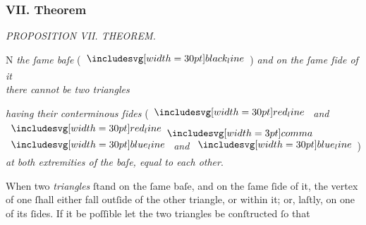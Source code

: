 \documentclass[11pt,preview]{standalone}
\begin{document}
\subsubsection{VII. Theorem}

\begin{minipage}[t]{0.55\textwidth}
    \begin{center}
        \textit{PROPOSITION VII. THEOREM.}\label{book1pr7} \\
    \end{center}

    \hfill

    \begin{center}
        \raggedright \lettrine[lines=3, loversize=1, nindent=0pt]{}{}N \textit{the ſame baſe} (\hspace{-1ex}$\blackline$\hspace{-1ex}) \textit{and on the ſame ſide of it\\ there cannot be two triangles}
    \end{center}
    \textit{having their conterminous ſides} (\hspace{-1ex}$\redline$ \textit{and} $\redline \bcomma$ $\blueline$ \textit{and} $\blueline$\hspace{-1ex}) \textit{at both extremities of} \textit{the baſe, equal to each other}.

    \hfill

    \raggedright When two \textit{triangles} ſtand on the ſame baſe, and on the ſame ſide of it, the vertex of one ſhall either fall outſide of the other triangle, or within it; or, laſtly, on one of its ſides. If it be poſſible let the two triangles be conſtructed ſo that
\end{minipage}%
\hfill
\begin{minipage}[t]{0.42\textwidth}
    \vspace{0pt}
    
\end{minipage}
\vspace{-4ex}
\end{document}
